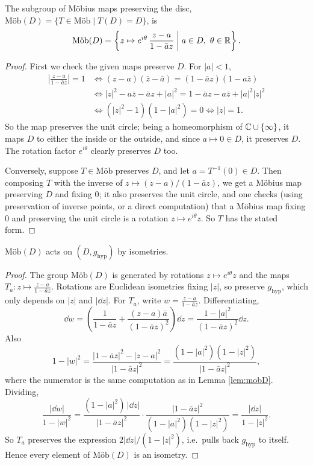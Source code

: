 \documentclass[a4paper]{scrartcl}
\newcommand{\Mob}{\text{M\"ob}}
\begin{document}
\begin{lemma}\label{lem:mobD}
    The subgroup of M\"obius maps preserving the disc, $\Mob(D) = \{T \in \Mob \mid T(D) = D\}$, is
    $$
    \Mob(D) = \left\{z \mapsto e^{i\theta}\, \frac{z - a}{1 - \bar{a} z} \;\middle|\; a \in D,\ \theta \in \R \right\}.
    $$
\end{lemma}
\begin{proof}
    First we check the given maps preserve $D$. For $|a| < 1$,
    \begin{align*}
        \left|\frac{z - a}{1 - \bar a z}\right| = 1 &\iff (z - a)(\bar z - \bar a) = (1 - \bar a z)(1 - a \bar z) \\
        &\iff |z|^2 - a \bar z - \bar a z + |a|^2 = 1 - \bar a z - a \bar z + |a|^2 |z|^2 \\
        &\iff (|z|^2 - 1)(1 - |a|^2) = 0 \iff |z| = 1.
    \end{align*}
    So the map preserves the unit circle; being a homeomorphism of $\mathbb{C} \cup \{\infty\}$, it maps $D$ to either the inside or the outside, and since $a \mapsto 0 \in D$, it preserves $D$. The rotation factor $e^{i\theta}$ clearly preserves $D$ too.

    Conversely, suppose $T \in \Mob$ preserves $D$, and let $a = T^{-1}(0) \in D$. Then composing $T$ with the inverse of $z \mapsto (z - a)/(1 - \bar a z)$, we get a M\"obius map preserving $D$ and fixing $0$; it also preserves the unit circle, and one checks (using preservation of inverse points, or a direct computation) that a M\"obius map fixing $0$ and preserving the unit circle is a rotation $z \mapsto e^{i\theta} z$. So $T$ has the stated form.
\end{proof}

\begin{lemma}\label{lem:mobisometry}
    $\Mob(D)$ acts on $(D, g_{\mathrm{hyp}})$ by isometries.
\end{lemma}
\begin{proof}
    The group $\Mob(D)$ is generated by rotations $z \mapsto e^{i\theta} z$ and the maps $T_a: z \mapsto \frac{z-a}{1 - \bar a z}$. Rotations are Euclidean isometries fixing $|z|$, so preserve $g_{\mathrm{hyp}}$, which only depends on $|z|$ and $|\dd z|$.
    For $T_a$, write $w = \frac{z - a}{1 - \bar a z}$. Differentiating,
    $$
    \dd w = \left(\frac{1}{1 - \bar a z} + \frac{(z - a)\bar a}{(1 - \bar a z)^2}\right) \dd z = \frac{1 - |a|^2}{(1 - \bar a z)^2} \dd z.
    $$
    Also
    $$
    1 - |w|^2 = \frac{|1 - \bar a z|^2 - |z - a|^2}{|1 - \bar a z|^2} = \frac{(1 - |a|^2)(1 - |z|^2)}{|1 - \bar a z|^2},
    $$
    where the numerator is the same computation as in Lemma \ref{lem:mobD}. Dividing,
    $$
    \frac{|\dd w|}{1 - |w|^2} = \frac{(1 - |a|^2)\,|\dd z|}{|1 - \bar a z|^2} \cdot \frac{|1 - \bar a z|^2}{(1 - |a|^2)(1 - |z|^2)} = \frac{|\dd z|}{1 - |z|^2}.
    $$
    So $T_a$ preserves the expression $2|\dd z|/(1 - |z|^2)$, i.e.\ pulls back $g_{\mathrm{hyp}}$ to itself. Hence every element of $\Mob(D)$ is an isometry.
\end{proof}
\end{document}
